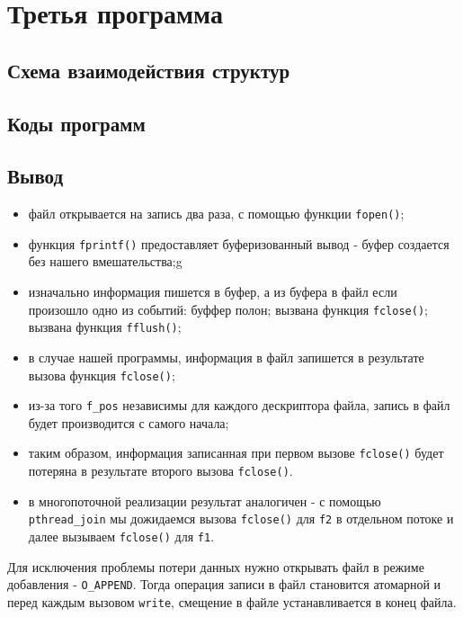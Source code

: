 \section{Третья программа}

\subsection{Схема взаимодействия структур}


\subsection{Коды программ}





\clearpage

\subsection*{Вывод}

\begin{itemize}
	\item файл открывается на запись два раза, с помощью функции \texttt{fopen()};
	\item функция \texttt{fprintf()} предоставляет буферизованный вывод - буфер создается без нашего вмешательства;g
	\item изначально информация пишется в буфер, а из буфера в файл если произошло одно из событий:
		\subitem буффер полон;
		\subitem вызвана функция \texttt{fclose()};
		\subitem вызвана функция \texttt{fflush()};
	\item в случае нашей программы, информация в файл запишется в результате вызова функция \texttt{fclose()};
	\item из-за того \texttt{f\_pos} независимы для каждого дескриптора файла, запись в файл будет производится с самого начала;
	\item таким образом, информация записанная при первом вызове \texttt{fclose()} будет потеряна в результате второго вызова \texttt{fclose()}.
	\item в многопоточной реализации результат аналогичен - с помощью \texttt{pthread\_join} мы дожидаемся вызова \texttt{fclose()} для \texttt{f2} в отдельном потоке и далее вызываем \texttt{fclose()} для \texttt{f1}.
\end{itemize}

Для исключения проблемы потери данных нужно открывать файл в режиме добавления - \texttt{O\_APPEND}. Тогда операция записи в файл становится атомарной и перед каждым вызовом \texttt{write}, смещение в файле устанавливается в конец файла.
